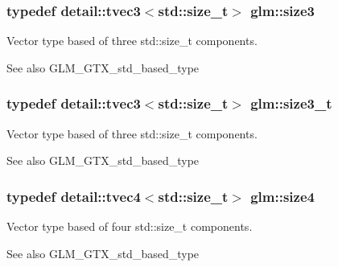 \subsubsection[{size3}]{\setlength{\rightskip}{0pt plus 5cm}typedef detail\+::tvec3$<$std\+::size\+\_\+t$>$ {\bf glm\+::size3}}\label{group__gtx__std__based__type_gaecfda56edf7fb1a0b98401c8cca8ffd6}
Vector type based of three std\+::size\+\_\+t components. \begin{DoxySeeAlso}{See also}
G\+L\+M\+\_\+\+G\+T\+X\+\_\+std\+\_\+based\+\_\+type 
\end{DoxySeeAlso}
\hypertarget{group__gtx__std__based__type_ga72cefc5d9c0cc5efac63f1cc050b0c3b}{}
\subsubsection[{size3\+\_\+t}]{\setlength{\rightskip}{0pt plus 5cm}typedef detail\+::tvec3$<$std\+::size\+\_\+t$>$ {\bf glm\+::size3\+\_\+t}}\label{group__gtx__std__based__type_ga72cefc5d9c0cc5efac63f1cc050b0c3b}
Vector type based of three std\+::size\+\_\+t components. \begin{DoxySeeAlso}{See also}
G\+L\+M\+\_\+\+G\+T\+X\+\_\+std\+\_\+based\+\_\+type 
\end{DoxySeeAlso}
\hypertarget{group__gtx__std__based__type_ga40ecc163f6abc59bc17dbc3040999e64}{}
\subsubsection[{size4}]{\setlength{\rightskip}{0pt plus 5cm}typedef detail\+::tvec4$<$std\+::size\+\_\+t$>$ {\bf glm\+::size4}}\label{group__gtx__std__based__type_ga40ecc163f6abc59bc17dbc3040999e64}
Vector type based of four std\+::size\+\_\+t components. \begin{DoxySeeAlso}{See also}
G\+L\+M\+\_\+\+G\+T\+X\+\_\+std\+\_\+based\+\_\+type 
\end{DoxySeeAlso}
\hypertarget{group__gtx__std__based__type_ga008fbe5ecf66e1fc6626ab9b5a38e27e}{}
